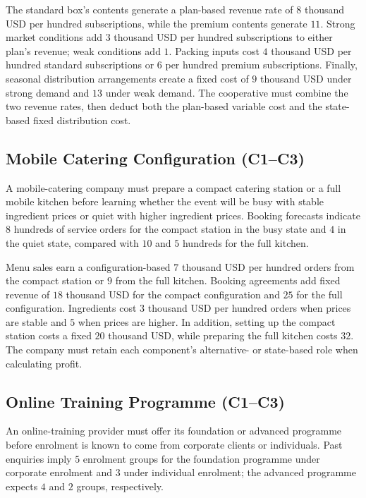 	The standard box's contents generate a plan-based revenue rate of \(8\) thousand USD per hundred subscriptions, while the premium contents generate \(11\). Strong market conditions add \(3\) thousand USD per hundred subscriptions to either plan's revenue; weak conditions add \(1\). Packing inputs cost \(4\) thousand USD per hundred standard subscriptions or \(6\) per hundred premium subscriptions. Finally, seasonal distribution arrangements create a fixed cost of \(9\) thousand USD under strong demand and \(13\) under weak demand. The cooperative must combine the two revenue rates, then deduct both the plan-based variable cost and the state-based fixed distribution cost.

	\subsection{Mobile Catering Configuration (C1--C3)}
	\label{sec:problem10-mobile-catering-configuration-c1-c3}

	A mobile-catering company must prepare a compact catering station or a full mobile kitchen before learning whether the event will be busy with stable ingredient prices or quiet with higher ingredient prices. Booking forecasts indicate \(8\) hundreds of service orders for the compact station in the busy state and \(4\) in the quiet state, compared with \(10\) and \(5\) hundreds for the full kitchen.

	Menu sales earn a configuration-based \(7\) thousand USD per hundred orders from the compact station or \(9\) from the full kitchen. Booking agreements add fixed revenue of \(18\) thousand USD for the compact configuration and \(25\) for the full configuration. Ingredients cost \(3\) thousand USD per hundred orders when prices are stable and \(5\) when prices are higher. In addition, setting up the compact station costs a fixed \(20\) thousand USD, while preparing the full kitchen costs \(32\). The company must retain each component's alternative- or state-based role when calculating profit.

	\subsection{Online Training Programme (C1--C3)}
	\label{sec:problem11-online-training-programme-c1-c3}

	An online-training provider must offer its foundation or advanced programme before enrolment is known to come from corporate clients or individuals. Past enquiries imply \(5\) enrolment groups for the foundation programme under corporate enrolment and \(3\) under individual enrolment; the advanced programme expects \(4\) and \(2\) groups, respectively.

